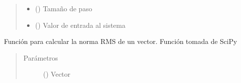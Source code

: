 \documentclass[letterpaper,10pt,spanish]{sphinxmanual}
\begin{document}
\begin{fulllineitems}
\begin{quote}
\begin{description}
\begin{itemize}
\item {} 
 () \textendash{} Tamaño de paso

\item {} 
 () \textendash{} Valor de entrada al sistema

\end{itemize}

\end{description}\end{quote}

\end{fulllineitems}


\begin{fulllineitems}
\label{\detokenize{codigos/rk_generator:rk_generator.norm}}
Función para calcular la norma RMS de un vector. Función tomada de SciPy
\begin{quote}\begin{description}
\item[{Parámetros}] \leavevmode
{} () \textendash{} Vector

\end{description}\end{quote}

\end{fulllineitems}

\end{document}
